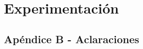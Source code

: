 \documentclass[10pt, a4paper, hidelinks]{article}
\begin{document}
\section{Experimentación}


\newpage



\subsection{Apéndice B - Aclaraciones}
\end{document}
